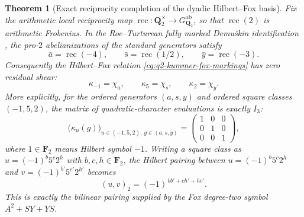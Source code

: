 \documentclass[11pt]{article}
\newtheorem{theorem}{Theorem}[section]
\theoremstyle{definition}
\begin{document}
\begin{theorem}[Exact reciprocity completion of the dyadic Hilbert--Fox basis]
\label{thm:dyadic-exact-hilbert-reciprocity-marking}
Fix the arithmetic local reciprocity map
$\operatorname{rec}:\mathbf Q_2^\times\to
G_{\mathbf Q_2}^{\mathrm{ab}}$,
so that $\operatorname{rec}(2)$ is arithmetic
Frobenius.  In the Roe--Turturean fully marked
Demu\v{s}kin identification
\cite{RoeTurtureanGQ2}, the pro-$2$
abelianizations of the standard generators satisfy
\begin{equation}\label{eq:dyadic-reciprocity-generator-images}
\boxed{\quad
\bar a=\operatorname{rec}(-4),\qquad
\bar s=\operatorname{rec}(1/2),\qquad
\bar y=\operatorname{rec}(-3).
\quad}
\end{equation}
Consequently the Hilbert--Fox relation
\eqref{eq:q2-kummer-fox-markings}
has \emph{zero} residual shear:
\begin{equation}\label{eq:dyadic-exact-kummer-fox}
\boxed{\quad
\kappa_{-1}=\chi_a,\qquad
\kappa_5=\chi_s,\qquad
\kappa_2=\chi_y.
\quad}
\end{equation}
More explicitly, for the ordered generators $(a,s,y)$
and ordered square classes $(-1,5,2)$, the matrix
of quadratic-character evaluations is exactly $I_3$:
\begin{equation}\label{eq:dyadic-exact-hilbert-evaluation}
\bigl(\kappa_u(g)\bigr)_{
u\in(-1,5,2),\ g\in(a,s,y)}
=
\begin{pmatrix}1&0&0\\0&1&0\\0&0&1\end{pmatrix},
\end{equation}
where $1\in\mathbf F_2$ means Hilbert symbol $-1$.
Writing a square class as
$u=(-1)^b5^c2^h$ with $b,c,h\in\mathbf F_2$,
the Hilbert pairing between
$u=(-1)^b5^c2^h$ and
$v=(-1)^{b'}5^{c'}2^{h'}$ becomes
\begin{equation}\label{eq:dyadic-square-class-hilbert-polar}
\boxed{\quad
(u,v)_2=(-1)^{\,bb'+ch'+hc'}.
\quad}
\end{equation}
This is exactly the bilinear pairing supplied by the
Fox degree-two symbol $A^2+SY+YS$.
\end{theorem}
\end{document}
